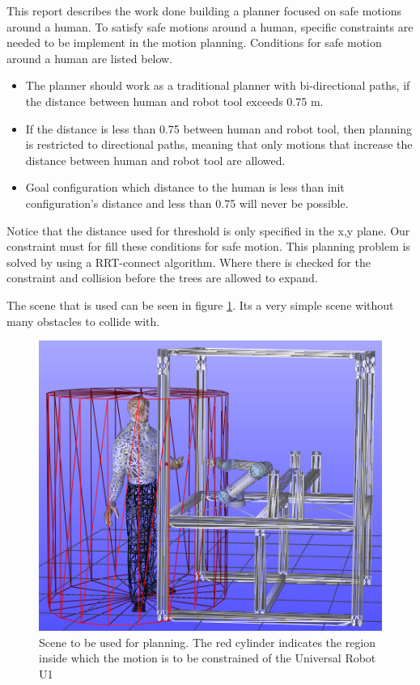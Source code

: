 This report describes the work done building a planner focused on safe motions around a human. To satisfy safe motions around a human, specific constraints are needed to be implement in the motion planning. Conditions for safe motion around a human are listed below. 

\begin{itemize} \label{introduction}
\item The planner should work as a traditional planner with bi-directional paths, if the distance between human and robot tool exceeds 0.75 m.
\item If the distance is less than 0.75 between human and robot tool, then planning is restricted to directional paths, meaning that only motions that increase the distance between human and robot tool are allowed.
\item Goal configuration which distance to the human is less than init configuration's distance and less than 0.75 will never be possible.
\end{itemize}

Notice that the distance used for threshold is only specified in the x,y plane.
Our constraint must for fill these conditions for safe motion.
This planning problem is solved by using a RRT-connect algorithm. Where there is checked for the constraint and collision before the trees are allowed to expand. 

The scene that is used can be seen in figure \ref{fig:u1}. Its a very simple scene without many obstacles to collide with. 

\begin{figure}[h]
 \centering
 \includegraphics[scale=0.6]{images/introductionpicture.png}
 \caption{Scene to be used for planning. The red cylinder indicates the region
inside which the motion is to be constrained of the Universal Robot U1
}
 \label{fig:u1}
\end{figure}

